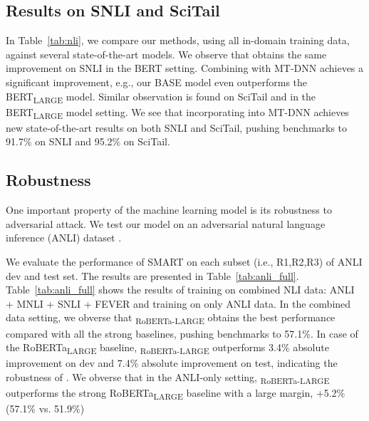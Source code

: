 \subsection{Results on SNLI and SciTail}


In Table~\ref{tab:nli}, we compare our methods, using all in-domain training data, against several state-of-the-art models. We observe that {\model} obtains the same improvement on SNLI in the BERT setting. Combining {\model} with MT-DNN achieves a significant improvement, e.g., our BASE model even outperforms the BERT\textsubscript{LARGE} model. Similar observation is found on SciTail and in the BERT\textsubscript{LARGE} model setting. We see that incorporating {\model} into MT-DNN achieves new state-of-the-art results on both SNLI and SciTail, pushing benchmarks to 91.7\% on SNLI and 95.2\% on SciTail.  











\subsection{Robustness}


One important property of the machine learning model is its robustness to adversarial attack. We test our model on an adversarial natural language inference (ANLI) dataset \cite{nie2019adversarial}. 

We evaluate the performance of SMART on each subset (i.e., R1,R2,R3) of ANLI dev and test set. The results are presented in Table~\ref{tab:anli_full}. Table~\ref{tab:anli_full} shows the results of training on combined NLI data: ANLI \citep{nie2019adversarial} + MNLI \citep{mnli2018} + SNLI \cite{snli2015} + FEVER \citep{thorne2018fever} and training on only ANLI data. In the combined data setting, we obverse that 	{\model}\textsubscript{RoBERTa-LARGE} obtains the best performance compared with all the strong baselines, pushing benchmarks to 57.1\%. In case of the RoBERTa\textsubscript{LARGE} baseline,  {\model}\textsubscript{RoBERTa-LARGE} outperforms 3.4\% absolute improvement on dev and 7.4\% absolute improvement on test, indicating the robustness of {\model}. We obverse that in the ANLI-only setting, {\model}\textsubscript{RoBERTa-LARGE} outperforms the strong RoBERTa\textsubscript{LARGE} baseline with a large margin, +5.2\% (57.1\% vs. 51.9\%)